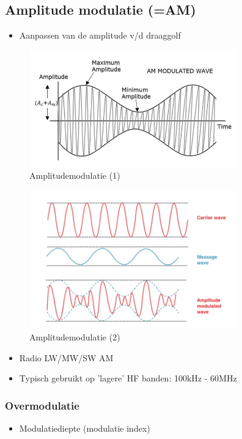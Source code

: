 \documentclass{article}
\begin{document}
\subsection{Amplitude modulatie (=AM)}
\begin{itemize}
    \item Aanpassen van de amplitude v/d draaggolf
\end{itemize}

\begin{figure}[H]
    \centering
    \includegraphics[width=0.8\textwidth]{Screenshot_20200302_120121.png}
    \caption{Amplitudemodulatie (1)}
\end{figure}

\begin{figure}[H]
    \centering
    \includegraphics[width=0.8\textwidth]{Screenshot_20200302_120147.png}
    \caption{Amplitudemodulatie (2)}
\end{figure}

\begin{itemize}
    \item Radio LW/MW/SW AM
    \item Typisch gebruikt op 'lagere' HF banden: 100kHz - 60MHz
\end{itemize}

\subsubsection{Overmodulatie}
\begin{itemize}
    \item Modulatiediepte (modulatie index)
\end{itemize}
\end{document}
